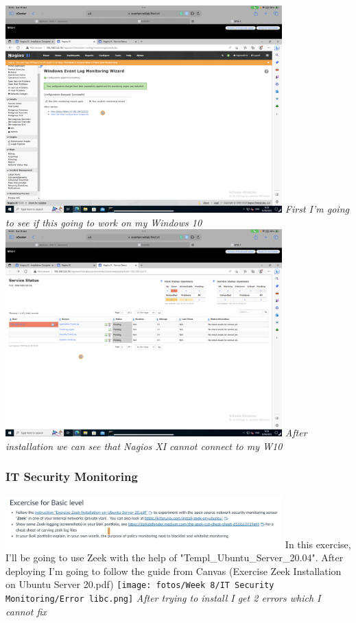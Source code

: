 \documentclass[12pt, letterpaper]{article}
\begin{document}
\includegraphics[width=0.8\textwidth]{fotos/Week 8/IT Basic Monitoring/Fotos/W10 agent attempt install.png}
\break
\emph{First I'm going to see if this going to work on my Windows 10}
\hfill\break
\hfill\break
\includegraphics[width=0.8\textwidth]{fotos/Week 8/IT Basic Monitoring/Fotos/W10 down.png}
\break
\emph{After installation we can see that Nagios XI cannot connect to my W10}
\newpage
\subsubsection{IT Security Monitoring}
\includegraphics[width=0.8\textwidth]{fotos/Week 8/IT Security Monitoring/Basiclevel.jpeg}
\hfill\break
\hfill\break
In this exercise, I'll be going to use Zeek with the help of "Templ\_Ubuntu\_Server\_20.04". After deploying I'm going to follow the guide from Canvas (Exercise Zeek Installation on Ubuntu Server 20.pdf)
\hfill\break
\hfill\break
\texttt{[image: fotos/Week 8/IT Security Monitoring/Error libc.png]}
\break
\emph{After trying to install I get 2 errors which I cannot fix}
\newpage
\end{document}
